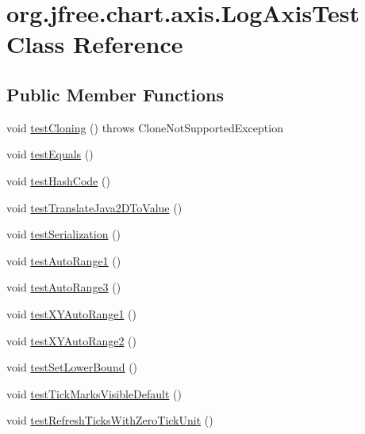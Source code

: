 \hypertarget{classorg_1_1jfree_1_1chart_1_1axis_1_1_log_axis_test}{}\section{org.\+jfree.\+chart.\+axis.\+Log\+Axis\+Test Class Reference}
\label{classorg_1_1jfree_1_1chart_1_1axis_1_1_log_axis_test}
\subsection*{Public Member Functions}
\begin{DoxyCompactItemize}
\item 
void \mbox{\hyperlink{classorg_1_1jfree_1_1chart_1_1axis_1_1_log_axis_test_a9b0affd492b2cc15d859fb8358fcf2a1}{test\+Cloning}} ()  throws Clone\+Not\+Supported\+Exception 
\item 
void \mbox{\hyperlink{classorg_1_1jfree_1_1chart_1_1axis_1_1_log_axis_test_a85714738a5aa9861dc092e401d239b43}{test\+Equals}} ()
\item 
void \mbox{\hyperlink{classorg_1_1jfree_1_1chart_1_1axis_1_1_log_axis_test_add81b13a6de2593b0530b3000338976f}{test\+Hash\+Code}} ()
\item 
void \mbox{\hyperlink{classorg_1_1jfree_1_1chart_1_1axis_1_1_log_axis_test_a5e7539613e5614d6b721dd435226b372}{test\+Translate\+Java2\+D\+To\+Value}} ()
\item 
void \mbox{\hyperlink{classorg_1_1jfree_1_1chart_1_1axis_1_1_log_axis_test_a223f756e4cbb3de0484138f46fc25c23}{test\+Serialization}} ()
\item 
void \mbox{\hyperlink{classorg_1_1jfree_1_1chart_1_1axis_1_1_log_axis_test_adc01174c255ae807a0d2ad210896064e}{test\+Auto\+Range1}} ()
\item 
void \mbox{\hyperlink{classorg_1_1jfree_1_1chart_1_1axis_1_1_log_axis_test_ab99b4812ed56569aea8daf523cf9a535}{test\+Auto\+Range3}} ()
\item 
void \mbox{\hyperlink{classorg_1_1jfree_1_1chart_1_1axis_1_1_log_axis_test_a202a57d7d2e0af4b1257080a664b1628}{test\+X\+Y\+Auto\+Range1}} ()
\item 
void \mbox{\hyperlink{classorg_1_1jfree_1_1chart_1_1axis_1_1_log_axis_test_a30d9c708bb32096d51c1e22b17f21316}{test\+X\+Y\+Auto\+Range2}} ()
\item 
void \mbox{\hyperlink{classorg_1_1jfree_1_1chart_1_1axis_1_1_log_axis_test_a76a600cf3ebf772492d1e6a6dfc2eb30}{test\+Set\+Lower\+Bound}} ()
\item 
void \mbox{\hyperlink{classorg_1_1jfree_1_1chart_1_1axis_1_1_log_axis_test_a2a052a4f91c6d44dfa35a868d06b23a4}{test\+Tick\+Marks\+Visible\+Default}} ()
\item 
void \mbox{\hyperlink{classorg_1_1jfree_1_1chart_1_1axis_1_1_log_axis_test_a522f649be02e1bb5b5cb0843d4ae9b5d}{test\+Refresh\+Ticks\+With\+Zero\+Tick\+Unit}} ()
\end{DoxyCompactItemize}


